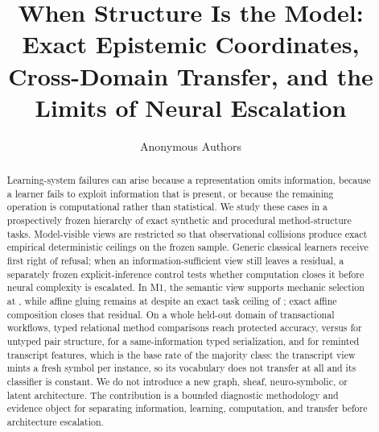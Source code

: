 \documentclass[10pt]{article}
\title{When Structure Is the Model: Exact Epistemic Coordinates, Cross-Domain Transfer, and the Limits of Neural Escalation}
\author{Anonymous Authors}
\begin{document}
\maketitle

\begin{abstract}
Learning-system failures can arise because a representation omits information, because a learner fails to exploit information that is present, or because the remaining operation is computational rather than statistical. We study these cases in a prospectively frozen hierarchy of exact synthetic and procedural method-structure tasks. Model-visible views are restricted so that observational collisions produce exact empirical deterministic ceilings on the frozen sample. Generic classical learners receive first right of refusal; when an information-sufficient view still leaves a residual, a separately frozen explicit-inference control tests whether computation closes it before neural complexity is escalated. In M1, the semantic view supports mechanic selection at \MOneSemanticMechanicAccuracy, while affine gluing remains at \MOneSemanticGluingAccuracy despite an exact task ceiling of \MOneSemanticGluingCeiling; exact affine composition closes that residual. On a whole held-out domain of transactional workflows, typed relational method comparisons reach \DOneTypedAccuracy protected accuracy, versus \DOneUntypedAccuracy for untyped pair structure, \DOneSerializedAccuracy for a same-information typed serialization, and \DOneTranscriptAccuracy for reminted transcript features, which is the base rate of the majority class: the transcript view mints a fresh symbol per instance, so its vocabulary does not transfer at all and its classifier is constant. We do not introduce a new graph, sheaf, neuro-symbolic, or latent architecture. The contribution is a bounded diagnostic methodology and evidence object for separating information, learning, computation, and transfer before architecture escalation.
\end{abstract}












\end{document}
